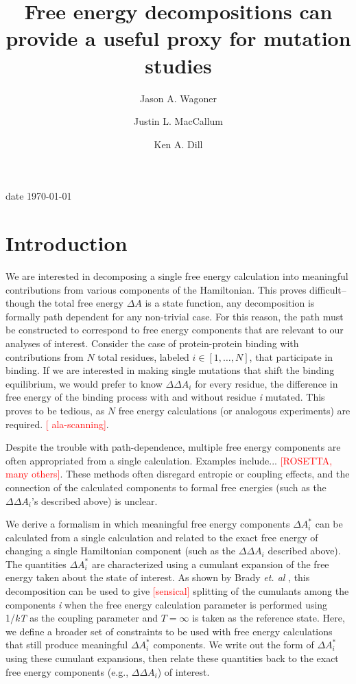 \documentclass[%
 preprint,
 amsmath,amssymb,
 aps,
]{revtex4-1}
\newcommand{\warning}[1]{{\textsf{{\textcolor{red}{{[#1]}{}}}}}}
\begin{document}
\title{Free energy decompositions can provide a useful proxy for mutation studies}
\author{Jason A. Wagoner}
\author{Justin L. MacCallum}
\author{Ken A. Dill}

date{ \today}


\begin{abstract}

\end{abstract}

\maketitle

\section{Introduction}
We are interested in decomposing a single free energy calculation into meaningful contributions from various components of  the Hamiltonian.  This proves difficult--though the total free energy $\Delta A$ is a state function, any decomposition is formally path dependent for any non-trivial case.  For this reason, the path must be constructed to correspond to free energy components that are relevant to our analyses of interest.  Consider the case of protein-protein binding with contributions from $N$ total residues, labeled $i\in \left[ 1, \dots, N\right]$, that participate in binding.  If we are interested in making single mutations that shift the binding equilibrium, we would prefer to know $\Delta \Delta A_i$ for every residue, 
the difference in free energy of the binding process with and without residue \textit{i} mutated.   This proves to be tedious, as $N$ free energy calculations (or analogous experiments) are required.   \warning{ ala-scanning}.  

Despite the trouble with path-dependence, multiple free energy components are often appropriated from a single calculation.  Examples include... \warning{ROSETTA, many others}.  These methods often disregard entropic or coupling effects, and the connection of the calculated components to formal free energies (such as the $\Delta \Delta A_i$'s described above) is unclear.  

We derive a formalism in which meaningful free energy components $\Delta A^*_i$ can be calculated from a single calculation and related to the exact free energy of changing a single Hamiltonian component (such as the $\Delta \Delta A_i$ described above).  The quantities $\Delta A^*_i$ are characterized using a cumulant expansion of the free energy taken about the state of interest.  As shown by Brady \emph{et. al} \cite{Brady:1996gm}, this decomposition can be used to give \warning{sensical} splitting of the cumulants among the components \textit{i} when the free energy calculation parameter is performed using 1/\emph{kT} as the coupling parameter and $T=\infty$ is taken as the reference state.  Here, we define a broader set of constraints to be used with free energy calculations that still produce meaningful $\Delta A^*_i$ components.  We write out the form of $\Delta A^*_i$ using these cumulant expansions, then relate these quantities back to the exact free energy components (e.g., $\Delta \Delta A_i$) of interest.  
\end{document}
